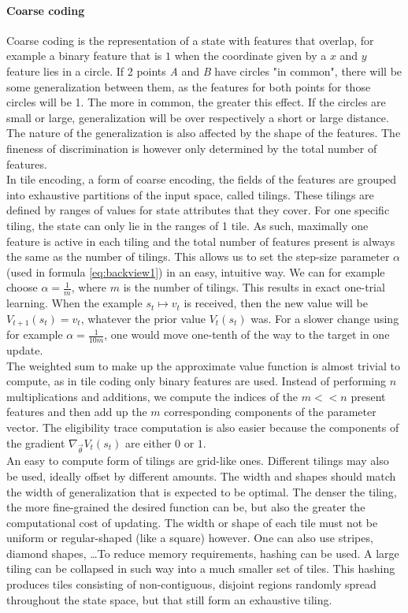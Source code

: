 \documentclass[a4paper]{article}
\begin{document}
\paragraph{Coarse coding}
Coarse coding is the representation of a state with features that overlap, for example a binary feature that is $1$ when the coordinate given by a $x$ and $y$ feature lies in a circle. If 2 points \textit{A} and \textit{B} have circles "in common", there will be some generalization between them, as the features for both points for those circles will be 1. The more in common, the greater this effect. If the circles are small or large, generalization will be over respectively a short or large distance. The nature of the generalization is also affected by the shape of the features. The fineness of discrimination is however only determined by the total number of features.\\
In tile encoding, a form of coarse encoding, the fields of the features are grouped into exhaustive partitions of the input space, called tilings. These tilings are defined by ranges of values for state attributes that they cover. For one specific tiling, the state can only lie in the ranges of 1 tile. As such, maximally one feature is active in each tiling and the total number of features present is always the same as the number of tilings. This allows us to set the step-size parameter $\alpha$ (used in formula \ref{eq:backview1}) in an easy, intuitive way. We can for example choose $\alpha = \frac{1}{m}$, where $m$ is the number of tilings. This results in exact one-trial learning. When the example $s_t \mapsto v_t$ is received, then the new value will be $V_{t+1}(s_t) = v_t$, whatever the prior value $V_t(s_t)$ was. For a slower change using for example $\alpha=\frac{1}{10m}$, one would move one-tenth of the way to the target in one update.\\
The weighted sum to make up the approximate value function is almost trivial to compute, as in tile coding only binary features are used. Instead of performing $n$ multiplications and additions, we compute the indices of the $m<<n$ present features and then add up the $m$ corresponding components of the parameter vector. The eligibility trace computation is also easier because the components of the gradient $\nabla_{\overrightarrow{\theta}} V_t(s_t)$ are either $0$ or $1$.\\
An easy to compute form of tilings are grid-like ones. Different tilings may also be used, ideally offset by different amounts. The width and shapes should match the width of generalization that is expected to be optimal. The denser the tiling, the more fine-grained the desired function can be, but also the greater the computational cost of updating. The width or shape of each tile must not be uniform or regular-shaped (like a square) however. One can also use stripes, diamond shapes, \dots To reduce memory requirements, hashing can be used. A large tiling can be collapsed in such way into a much smaller set of tiles. This hashing produces tiles consisting of non-contiguous, disjoint regions randomly spread throughout the state space, but that still form an exhaustive tiling.\\
\end{document}
